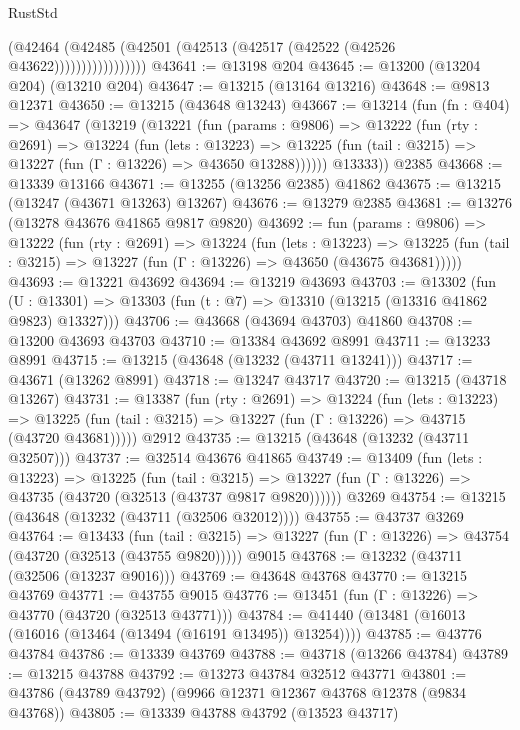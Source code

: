 \begin{lexlean}{RustStd}
\begin{coremodule}
                        (@42464
                          (@42485 (@42501 (@42513 (@42517 (@42522 (@42526 @43622)))))))))))))))))
@43641 := @13198 @204
@43645 := @13200 (@13204 @204) (@13210 @204)
@43647 := @13215 (@13164 @13216)
@43648 := @9813 @12371
@43650 := @13215 (@43648 @13243)
@43667 := @13214
    (fun (fn : @404) =>
    @43647
      (@13219
        (@13221
          (fun (params : @9806) =>
          @13222
            (fun (rty : @2691) =>
            @13224
              (fun (lets : @13223) =>
              @13225 (fun (tail : @3215) => @13227 (fun (Γ : @13226) => @43650 @13288))))))
        @13333))
    @2385
@43668 := @13339 @13166
@43671 := @13255 (@13256 @2385) @41862
@43675 := @13215 (@13247 (@43671 @13263) @13267)
@43676 := @13279 @2385
@43681 := @13276 (@13278 @43676 @41865 @9817 @9820)
@43692 := fun (params : @9806) =>
  @13222
    (fun (rty : @2691) =>
    @13224
      (fun (lets : @13223) =>
      @13225 (fun (tail : @3215) => @13227 (fun (Γ : @13226) => @43650 (@43675 @43681)))))
@43693 := @13221 @43692
@43694 := @13219 @43693
@43703 := @13302
    (fun (U : @13301) => @13303 (fun (t : @7) => @13310 (@13215 (@13316 @41862 @9823) @13327)))
@43706 := @43668 (@43694 @43703) @41860
@43708 := @13200 @43693 @43703
@43710 := @13384 @43692 @8991
@43711 := @13233 @8991
@43715 := @13215 (@43648 (@13232 (@43711 @13241)))
@43717 := @43671 (@13262 @8991)
@43718 := @13247 @43717
@43720 := @13215 (@43718 @13267)
@43731 := @13387
    (fun (rty : @2691) =>
    @13224
      (fun (lets : @13223) =>
      @13225 (fun (tail : @3215) => @13227 (fun (Γ : @13226) => @43715 (@43720 @43681)))))
    @2912
@43735 := @13215 (@43648 (@13232 (@43711 @32507)))
@43737 := @32514 @43676 @41865
@43749 := @13409
    (fun (lets : @13223) =>
    @13225
      (fun (tail : @3215) =>
      @13227 (fun (Γ : @13226) => @43735 (@43720 (@32513 (@43737 @9817 @9820))))))
    @3269
@43754 := @13215 (@43648 (@13232 (@43711 (@32506 @32012))))
@43755 := @43737 @3269
@43764 := @13433
    (fun (tail : @3215) => @13227 (fun (Γ : @13226) => @43754 (@43720 (@32513 (@43755 @9820)))))
    @9015
@43768 := @13232 (@43711 (@32506 (@13237 @9016)))
@43769 := @43648 @43768
@43770 := @13215 @43769
@43771 := @43755 @9015
@43776 := @13451 (fun (Γ : @13226) => @43770 (@43720 (@32513 @43771)))
@43784 := @41440 (@13481 (@16013 (@16016 (@13464 (@13494 (@16191 @13495)) @13254))))
@43785 := @43776 @43784
@43786 := @13339 @43769
@43788 := @43718 (@13266 @43784)
@43789 := @13215 @43788
@43792 := @13273 @43784 @32512 @43771
@43801 := @43786 (@43789 @43792) (@9966 @12371 @12367 @43768 @12378 (@9834 @43768))
@43805 := @13339 @43788 @43792 (@13523 @43717)

\end{coremodule}
\end{lexlean}
